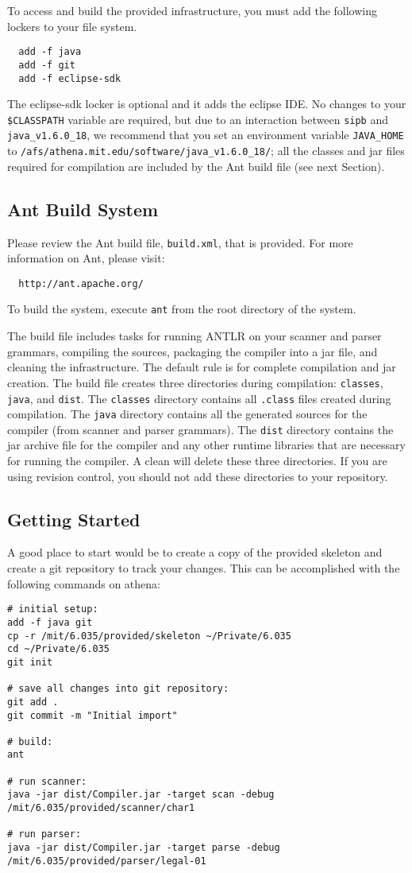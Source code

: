 To access and build the provided infrastructure, you must add the
following lockers to your file system.
\begin{verbatim}
  add -f java
  add -f git
  add -f eclipse-sdk
\end{verbatim}
The eclipse-sdk locker is optional and it adds the eclipse IDE.  No
changes to your {\tt \$CLASSPATH} variable are required, but due to
an interaction between {\tt sipb} and {\tt java\_v1.6.0\_18}, we
recommend that you set an environment variable {\tt JAVA\_HOME} to
{\tt /afs/athena.mit.edu/software/java\_v1.6.0\_18/}; all the
classes and jar files required for compilation are included by the
Ant build file (see next Section).

\subsection*{Ant Build System}

Please review the Ant build file, {\tt build.xml}, that is
provided. For more information on Ant, please visit:
\begin{verbatim}
  http://ant.apache.org/
\end{verbatim}
To build the system, execute {\tt ant} from the root directory of the system.

The build file includes tasks for running ANTLR on your scanner and parser
grammars, compiling the sources, packaging the compiler into a jar file, and
cleaning the infrastructure.  The default rule is for complete compilation and
jar creation. The build file creates three directories during compilation:
{\tt classes}, {\tt java}, and {\tt dist}.  The {\tt classes} directory
contains all {\tt .class} files created during compilation.  The {\tt java}
directory contains all the generated sources for the compiler (from scanner and
parser grammars). The {\tt dist} directory contains the jar archive file for
the compiler and any other runtime libraries that are necessary for running
the compiler. A clean will delete these three directories. If you are using
revision control, you should not add these directories to your repository.

\subsection*{Getting Started}

A good place to start would be to create a copy of the provided skeleton
and create a git repository to track your changes.  This can be accomplished
with the following commands on athena:
\begin{verbatim}
# initial setup:
add -f java git
cp -r /mit/6.035/provided/skeleton ~/Private/6.035
cd ~/Private/6.035
git init

# save all changes into git repository:
git add .
git commit -m "Initial import"

# build:
ant

# run scanner:
java -jar dist/Compiler.jar -target scan -debug /mit/6.035/provided/scanner/char1

# run parser:
java -jar dist/Compiler.jar -target parse -debug /mit/6.035/provided/parser/legal-01
\end{verbatim}

